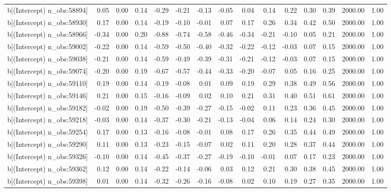 \begin{table}[ht]
\begin{tabular}{rrrrrrrrrrrrrrr}
  b[(Intercept) n\_obs:58894] & 0.05 & 0.00 & 0.14 & -0.29 & -0.21 & -0.13 & -0.05 & 0.04 & 0.14 & 0.22 & 0.30 & 0.39 & 2000.00 & 1.00 \\ 
  b[(Intercept) n\_obs:58930] & 0.17 & 0.00 & 0.14 & -0.19 & -0.10 & -0.01 & 0.07 & 0.17 & 0.26 & 0.34 & 0.42 & 0.50 & 2000.00 & 1.00 \\ 
  b[(Intercept) n\_obs:58966] & -0.34 & 0.00 & 0.20 & -0.88 & -0.74 & -0.58 & -0.46 & -0.34 & -0.21 & -0.10 & 0.05 & 0.21 & 2000.00 & 1.00 \\ 
  b[(Intercept) n\_obs:59002] & -0.22 & 0.00 & 0.14 & -0.59 & -0.50 & -0.40 & -0.32 & -0.22 & -0.12 & -0.03 & 0.07 & 0.15 & 2000.00 & 1.00 \\ 
  b[(Intercept) n\_obs:59038] & -0.21 & 0.00 & 0.14 & -0.59 & -0.49 & -0.39 & -0.31 & -0.21 & -0.12 & -0.03 & 0.07 & 0.15 & 2000.00 & 1.00 \\ 
  b[(Intercept) n\_obs:59074] & -0.20 & 0.00 & 0.19 & -0.67 & -0.57 & -0.44 & -0.33 & -0.20 & -0.07 & 0.05 & 0.16 & 0.25 & 2000.00 & 1.00 \\ 
  b[(Intercept) n\_obs:59110] & 0.19 & 0.00 & 0.14 & -0.19 & -0.08 & 0.01 & 0.09 & 0.19 & 0.29 & 0.38 & 0.49 & 0.56 & 2000.00 & 1.00 \\ 
  b[(Intercept) n\_obs:59146] & 0.21 & 0.00 & 0.15 & -0.16 & -0.09 & 0.02 & 0.10 & 0.21 & 0.31 & 0.40 & 0.51 & 0.61 & 2000.00 & 1.00 \\ 
  b[(Intercept) n\_obs:59182] & -0.02 & 0.00 & 0.19 & -0.50 & -0.39 & -0.27 & -0.15 & -0.02 & 0.11 & 0.23 & 0.36 & 0.45 & 2000.00 & 1.00 \\ 
  b[(Intercept) n\_obs:59218] & -0.03 & 0.00 & 0.14 & -0.37 & -0.30 & -0.21 & -0.13 & -0.04 & 0.06 & 0.14 & 0.24 & 0.30 & 2000.00 & 1.00 \\ 
  b[(Intercept) n\_obs:59254] & 0.17 & 0.00 & 0.13 & -0.16 & -0.08 & -0.01 & 0.08 & 0.17 & 0.26 & 0.35 & 0.44 & 0.49 & 2000.00 & 1.00 \\ 
  b[(Intercept) n\_obs:59290] & 0.11 & 0.00 & 0.13 & -0.23 & -0.15 & -0.07 & 0.02 & 0.11 & 0.20 & 0.28 & 0.37 & 0.44 & 2000.00 & 1.00 \\ 
  b[(Intercept) n\_obs:59326] & -0.10 & 0.00 & 0.14 & -0.45 & -0.37 & -0.27 & -0.19 & -0.10 & -0.01 & 0.07 & 0.17 & 0.23 & 2000.00 & 1.00 \\ 
  b[(Intercept) n\_obs:59362] & 0.12 & 0.00 & 0.14 & -0.22 & -0.14 & -0.06 & 0.03 & 0.12 & 0.21 & 0.30 & 0.38 & 0.45 & 2000.00 & 1.00 \\ 
  b[(Intercept) n\_obs:59398] & 0.01 & 0.00 & 0.14 & -0.32 & -0.26 & -0.16 & -0.08 & 0.02 & 0.10 & 0.19 & 0.27 & 0.35 & 2000.00 & 1.00 \\ 

\end{tabular}
\end{table}
